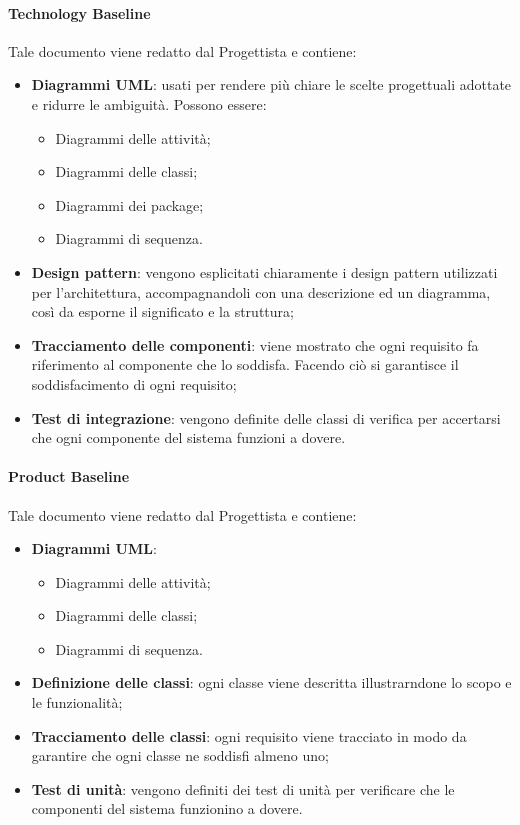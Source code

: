 	     \paragraph{Technology Baseline}
	     Tale documento viene redatto dal Progettista e contiene:
	     \begin{itemize}
	     	\item{\textbf{Diagrammi UML}: usati per rendere più chiare le scelte progettuali adottate e ridurre le ambiguità. Possono essere:
                    \begin{itemize}
                    	\item{Diagrammi delle attività;}
    			\item{Diagrammi delle classi;}
    			\item{Diagrammi dei package;}    			
			\item{Diagrammi di sequenza.}                    
		\end{itemize}
}
		\item{\textbf{Design pattern}: vengono esplicitati chiaramente i design pattern utilizzati per l'architettura, accompagnandoli con una descrizione ed un diagramma, così da esporne il significato e la struttura;}
		\item{\textbf{Tracciamento delle componenti}: viene mostrato che ogni requisito fa riferimento al componente che lo soddisfa. Facendo ciò si garantisce il soddisfacimento di ogni requisito;}
		\item{\textbf{Test di integrazione}: vengono definite delle classi di verifica per accertarsi che ogni componente del sistema funzioni a dovere.}
	     \end{itemize}
	     
	     \paragraph{Product Baseline}
	     Tale documento viene redatto dal Progettista e contiene:
	     \begin{itemize}
	     	\item{\textbf{Diagrammi UML}:
			\begin{itemize}
				\item{Diagrammi delle attività;}
    				\item{Diagrammi delle classi;}
				\item{Diagrammi di sequenza.}
			\end{itemize}
			}
		\item{\textbf{Definizione delle classi}: ogni classe viene descritta illustrarndone lo scopo e le funzionalità;}
		\item{\textbf{Tracciamento delle classi}: ogni requisito viene tracciato in modo da garantire che ogni classe ne soddisfi almeno uno;}
		\item{\textbf{Test di unità}: vengono definiti dei test di unità per verificare che le componenti del sistema funzionino a dovere.}
	     \end{itemize}
	     
